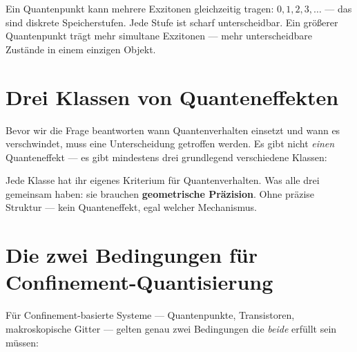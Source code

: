 Ein Quantenpunkt kann mehrere Exzitonen gleichzeitig tragen:
$0, 1, 2, 3, \ldots$ --- das sind diskrete Speicherstufen.
Jede Stufe ist scharf unterscheidbar. Ein größerer Quantenpunkt
trägt mehr simultane Exzitonen --- mehr unterscheidbare Zustände
in einem einzigen Objekt.

\section{Drei Klassen von Quanteneffekten}
\label{sec:drei-klassen}

Bevor wir die Frage beantworten wann Quantenverhalten
einsetzt und wann es verschwindet, muss eine Unterscheidung
getroffen werden. Es gibt nicht \emph{einen} Quanteneffekt ---
es gibt mindestens drei grundlegend verschiedene Klassen:

\begin{center}
\end{center}

Jede Klasse hat ihr eigenes Kriterium für Quantenverhalten.
Was alle drei gemeinsam haben: sie brauchen \textbf{geometrische
Präzision}. Ohne präzise Struktur --- kein Quanteneffekt,
egal welcher Mechanismus.

\section{Die zwei Bedingungen für Confinement-Quantisierung}
\label{sec:zwei-bedingungen}

Für Confinement-basierte Systeme --- Quantenpunkte, Transistoren,
makroskopische Gitter --- gelten genau zwei Bedingungen
die \emph{beide} erfüllt sein müssen:

